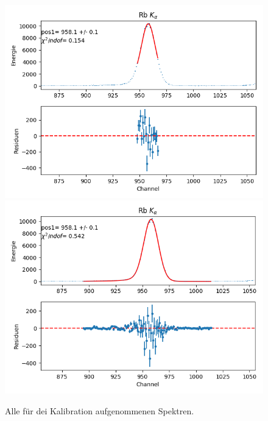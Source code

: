 \documentclass[12pt,a4paper]{article}
\begin{document}
\begin{figure}[H]
\centering
\includegraphics[scale=0.8]{Bilder/alpha/rb_alpha_1.png}
\includegraphics[scale=0.8]{Bilder/alpha/rb_alpha_2.png}
\caption{Alle für dei Kalibration aufgenommenen Spektren.}
\label{fig:kal_alles}
\end{figure}
\end{document}
